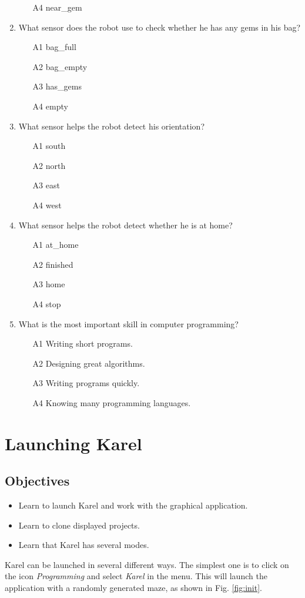 \begin{enumerate}
\begin{enumerate}
\item[A4] near\_gem
\end{enumerate}
\item What sensor does the robot use to check whether he has any gems in his bag?
\begin{enumerate}
\item[A1] bag\_full
\item[A2] bag\_empty
\item[A3] has\_gems
\item[A4] empty
\end{enumerate}
\item What sensor helps the robot detect his orientation?
\begin{enumerate}
\item[A1] south
\item[A2] north
\item[A3] east
\item[A4] west
\end{enumerate}
\item What sensor helps the robot detect whether he is at home?
\begin{enumerate}
\item[A1] at\_home
\item[A2] finished
\item[A3] home
\item[A4] stop
\end{enumerate}
\item What is the most important skill in computer programming?
\begin{enumerate}
\item[A1] Writing short programs.
\item[A2] Designing great algorithms.
\item[A3] Writing programs quickly.
\item[A4] Knowing many programming languages.
\end{enumerate}
\end{enumerate}


\section{Launching Karel}

\subsection{Objectives} 
\begin{itemize}
\item Learn to launch Karel and work with the graphical application.
\item Learn to clone displayed projects.
\item Learn that Karel has several modes.
\end{itemize}
Karel can be launched in several different ways. The simplest one is to click on the icon 
{\em Programming} and select {\em Karel} in the menu. This will launch the application 
with a randomly generated maze, as shown in Fig. \ref{fig:init}.
\newpage


